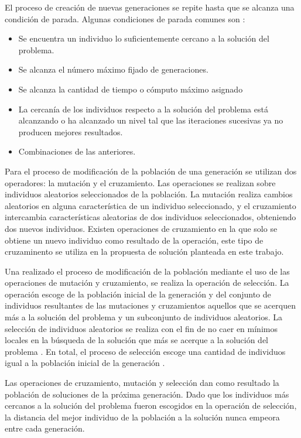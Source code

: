 El proceso de creación de nuevas generaciones se repite hasta que se alcanza una condición de parada. Algunas condiciones de parada comunes son \cite{mitchell1998introduction}:

\begin{itemize}
    \item Se encuentra un individuo lo suficientemente cercano a la solución del problema.
    \item Se alcanza el número máximo fijado de generaciones.
    \item Se alcanza la cantidad de tiempo o cómputo máximo asignado
    \item La cercanía de los individuos respecto a la solución del problema está alcanzando o ha alcanzado un nivel tal que las iteraciones sucesivas ya no producen mejores resultados.
    \item Combinaciones de las anteriores.
\end{itemize}

Para el proceso de modificación de la población de una generación se utilizan dos operadores: la mutación y el cruzamiento. Las operaciones se realizan sobre individuos aleatorios seleccionados de la población. La mutación realiza cambios aleatorios en alguna característica de un individuo seleccionado, y el cruzamiento intercambia características aleatorias de dos individuos seleccionados, obteniendo dos nuevos individuos. Existen operaciones de cruzamiento en la que solo se obtiene un nuevo individuo como resultado de la operación, este tipo de cruzaminento se utiliza en la propuesta de solución planteada en este trabajo.

Una realizado el proceso de modificación de la población mediante el uso de las operaciones de mutación y cruzamiento, se realiza la operación de selección. La operación escoge de la población inicial de la generación y del conjunto de individuos resultantes de las mutaciones y cruzamientos aquellos que se acerquen más a la solución del problema y un subconjunto de individuos aleatorios. La selección de individuos aleatorios se realiza con el fin de no caer en mínimos locales en la búsqueda de la solución que más se acerque a la solución del problema \cite{mitchell1998introduction}. En total, el proceso de selección escoge una cantidad de individuos igual a la población inicial de la generación \cite{mitchell1998introduction}.

Las operaciones de cruzamiento, mutación y selección dan como resultado la población de soluciones de la próxima generación. Dado que los individuos más cercanos a la solución del problema fueron escogidos en la operación de selección, la distancia del mejor individuo de la población a la solución nunca empeora entre cada generación.

